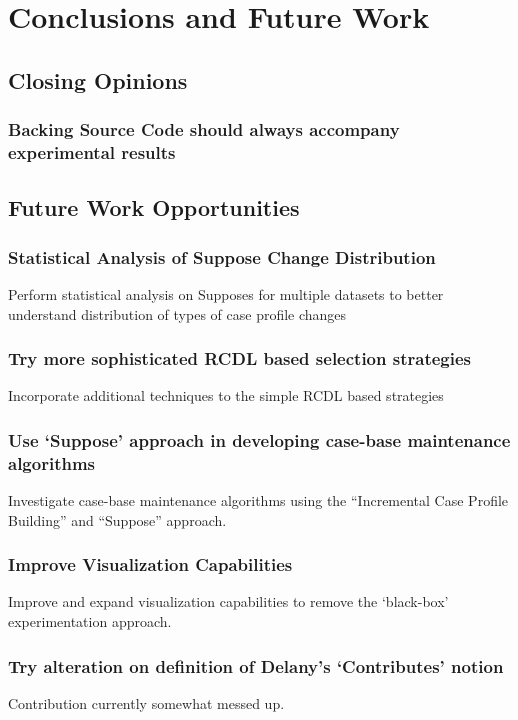 \documentclass[a4paper,11pt]{report}
\begin{document}
\chapter{Conclusions and Future Work\label{cha:conclusions}}

\section{Closing Opinions}
\subsection{Backing Source Code should always accompany experimental results}

\section{Future Work Opportunities}
\subsection{Statistical Analysis of Suppose Change Distribution}
Perform statistical analysis on Supposes for multiple datasets to better understand distribution of types of case profile changes

\subsection{Try more sophisticated RCDL based selection strategies}
Incorporate additional techniques to the simple RCDL based strategies

\subsection{Use `Suppose' approach in developing case-base maintenance algorithms}
Investigate case-base maintenance algorithms using the ``Incremental Case Profile Building'' and ``Suppose'' approach.

\subsection{Improve Visualization Capabilities}
Improve and expand visualization capabilities to remove the `black-box' experimentation approach.

\subsection{Try alteration on definition of Delany's `Contributes' notion}
Contribution currently somewhat messed up.
\end{document}
